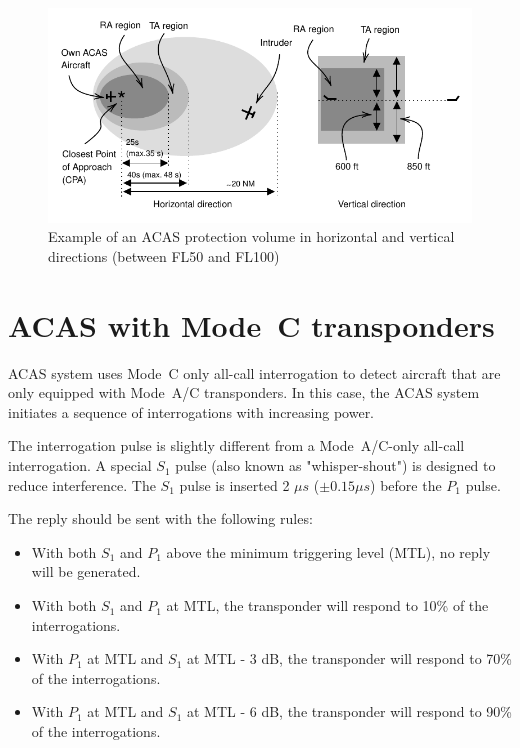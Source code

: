 \begin{figure}[ht]
\centering
\includegraphics[scale=0.9]{figures/mode_s/acas_regions.pdf}
\caption{Example of an ACAS protection volume in horizontal and vertical directions (between FL50 and FL100)}
\label{fig:acas_regions}
\end{figure}




\section{ACAS with Mode~C transponders}

ACAS system uses Mode~C only all-call interrogation to detect aircraft that are only equipped with Mode~A/C transponders. In this case, the ACAS system initiates a sequence of interrogations with increasing power.

The interrogation pulse is slightly different from a Mode~A/C-only all-call interrogation. A special $S_1$ pulse (also known as "whisper-shout") is designed to reduce interference. The $S_1$ pulse is inserted 2 $\mu s$ ($\pm 0.15 \mu s$) before the $P_1$ pulse.

The reply should be sent with the following rules:

\begin{itemize}
  \item With both $S_1$ and $P_1$ above the minimum triggering level (MTL), no reply will be generated.
  \item With both $S_1$ and $P_1$ at MTL, the transponder will respond to 10\% of the interrogations.
  \item With $P_1$ at MTL and $S_1$ at MTL - 3 dB, the transponder will respond to 70\% of the interrogations.
  \item With $P_1$ at MTL and $S_1$ at MTL - 6 dB, the transponder will respond to 90\% of the interrogations.
\end{itemize}

